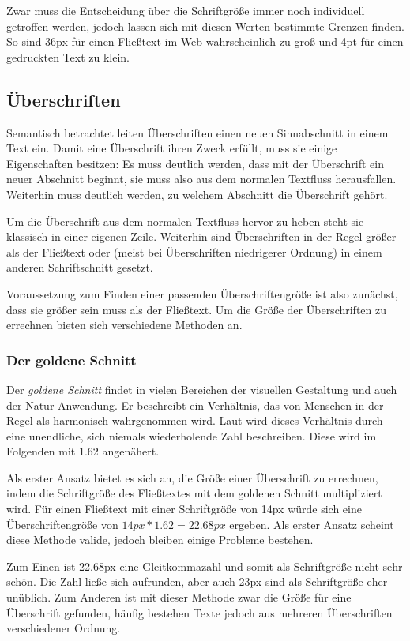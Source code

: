 Zwar muss die Entscheidung über die Schriftgröße immer noch individuell getroffen werden, jedoch lassen sich mit diesen Werten bestimmte Grenzen finden. So sind 36px für einen Fließtext im Web wahrscheinlich zu groß und 4pt für einen gedruckten Text zu klein.

\subsection{Überschriften}
Semantisch betrachtet leiten Überschriften einen neuen Sinnabschnitt in einem Text ein. Damit eine Überschrift ihren Zweck erfüllt, muss sie einige Eigenschaften besitzen:
Es muss deutlich werden, dass mit der Überschrift ein neuer Abschnitt beginnt, sie muss also aus dem normalen Textfluss herausfallen. Weiterhin muss deutlich werden, zu welchem Abschnitt die Überschrift gehört.

Um die Überschrift aus dem normalen Textfluss hervor zu heben steht sie klassisch in einer eigenen Zeile. Weiterhin sind Überschriften in der Regel größer als der Fließtext oder (meist bei Überschriften niedrigerer Ordnung) in einem anderen Schriftschnitt gesetzt.

Voraussetzung zum Finden einer passenden Überschriftengröße ist also zunächst, dass sie größer sein muss als der Fließtext. Um die Größe der Überschriften zu errechnen bieten sich verschiedene Methoden an.

\subsubsection{Der goldene Schnitt}
Der \textit{goldene Schnitt} findet in vielen Bereichen der visuellen Gestaltung und auch der Natur Anwendung. Er beschreibt ein Verhältnis, das von Menschen in der Regel als harmonisch wahrgenommen wird.
Laut \cite{livio2003golden} wird dieses Verhältnis durch eine unendliche, sich niemals wiederholende Zahl beschreiben. Diese wird im Folgenden mit 1.62 angenähert.

Als erster Ansatz bietet es sich an, die Größe einer Überschrift zu errechnen, indem die Schriftgröße des Fließtextes mit dem goldenen Schnitt multipliziert wird.
Für einen Fließtext mit einer Schriftgröße von 14px würde sich eine Überschriftengröße von \(14px * 1.62 = 22.68px\) ergeben.
Als erster Ansatz scheint diese Methode valide, jedoch bleiben einige Probleme bestehen.

Zum Einen ist 22.68px eine Gleitkommazahl und somit als Schriftgröße nicht sehr schön. Die Zahl ließe sich aufrunden, aber auch 23px sind als Schriftgröße eher unüblich.
Zum Anderen ist mit dieser Methode zwar die Größe für eine Überschrift gefunden, häufig bestehen Texte jedoch aus mehreren Überschriften verschiedener Ordnung.

